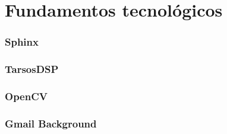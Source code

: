 \chapter{Fundamentos tecnológicos}
\label{chap:fundamentos-tecnologicos}


 \subsection{Sphinx}
 
 \subsection{TarsosDSP}
 
 \subsection{OpenCV}
 
 \subsection{Gmail Background}
 